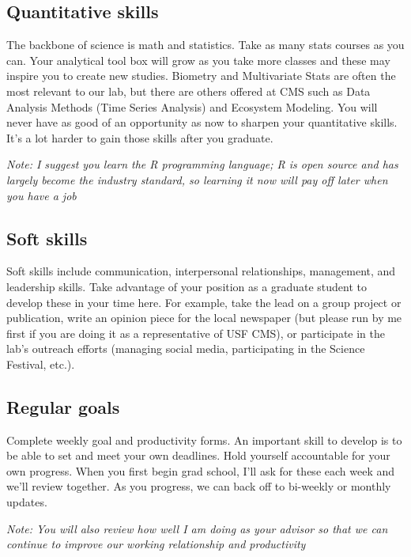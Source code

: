 \documentclass[
]{article}
\begin{document}
\hypertarget{quantitative-skills}{%
\subsection{Quantitative skills}\label{quantitative-skills}}

The backbone of science is math and statistics. Take as many stats courses as you can. Your analytical tool box will grow as you take more classes and these may inspire you to create new studies. Biometry and Multivariate Stats are often the most relevant to our lab, but there are others offered at CMS such as Data Analysis Methods (Time Series Analysis) and Ecosystem Modeling. You will never have as good of an opportunity as now to sharpen your quantitative skills. It's a lot harder to gain those skills after you graduate.

\emph{Note: I suggest you learn the R programming language; R is open source and has largely become the industry standard, so learning it now will pay off later when you have a job}

\hypertarget{soft-skills}{%
\subsection{Soft skills}\label{soft-skills}}

Soft skills include communication, interpersonal relationships, management, and leadership skills. Take advantage of your position as a graduate student to develop these in your time here. For example, take the lead on a group project or publication, write an opinion piece for the local newspaper (but please run by me first if you are doing it as a representative of USF CMS), or participate in the lab's outreach efforts (managing social media, participating in the Science Festival, etc.).

\hypertarget{regular-goals}{%
\subsection{Regular goals}\label{regular-goals}}

Complete weekly goal and productivity forms. An important skill to develop is to be able to set and meet your own deadlines. Hold yourself accountable for your own progress. When you first begin grad school, I'll ask for these each week and we'll review together. As you progress, we can back off to bi-weekly or monthly updates.

\emph{Note: You will also review how well I am doing as your advisor so that we can continue to improve our working relationship and productivity}
\end{document}
